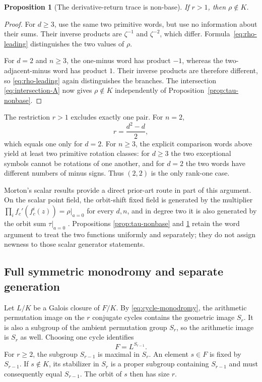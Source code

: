\documentclass[11pt]{article}
\newtheorem{proposition}[theorem]{Proposition}
\theoremstyle{definition}
\theoremstyle{remark}
\begin{document}
\begin{proposition}[The derivative-return trace is non-base]
\label{prop:rho-nonbase}
If $r>1$, then $\rho\notin K$.
\end{proposition}

\begin{proof}
For $d\geq3$, use the same two primitive words, but use no information about
their sums.  Their inverse products are $\zeta^{-1}$ and $\zeta^{-2}$,
which differ.  Formula~\eqref{eq:rho-leading} distinguishes the two values
of $\rho$.

For $d=2$ and $n\geq3$, the one-minus word has product $-1$, whereas the
two-adjacent-minus word has product $1$.  Their inverse products are
therefore different, so \eqref{eq:rho-leading} again distinguishes the
branches.  The intersection \eqref{eq:intersection-A} now gives
$\rho\notin K$ independently of Proposition~\ref{prop:tau-nonbase}.
\end{proof}

The restriction $r>1$ excludes exactly one pair.  For $n=2$,
\[
 r=\frac{d^2-d}{2},
\]
which equals one only for $d=2$.  For $n\geq3$, the explicit comparison
words above yield at least two primitive rotation classes: for $d\geq3$ the
two exceptional symbols cannot be rotations of one another, and for $d=2$
the two words have different numbers of minus signs.  Thus $(2,2)$ is the
only rank-one case.

Morton's scalar results provide a direct prior-art route in part of this
argument.  On the scalar point field, the orbit-shift fixed field is
generated by the multiplier
$\prod_i f_c'(f_c^i(z))=\rho|_{a=0}$ for every $d,n$, and in degree two it is
also generated by the orbit sum $\tau|_{a=0}$
\citep{morton-1996-algebraic-curves}.  Propositions
\ref{prop:tau-nonbase} and \ref{prop:rho-nonbase} retain the word argument to
treat the two functions uniformly and separately; they do not assign newness
to those scalar generator statements.

\subsection{Full symmetric monodromy and separate generation}

Let $L/K$ be a Galois closure of $F/K$.  By
\eqref{eq:cycle-monodromy}, the arithmetic permutation image on the $r$
conjugate cycles contains the geometric image $S_r$.  It is also a subgroup
of the ambient permutation group $S_r$, so the arithmetic image is $S_r$ as
well.  Choosing one cycle identifies
\[
 F=L^{S_{r-1}}.
\]
For $r\geq2$, the subgroup $S_{r-1}$ is maximal in $S_r$.  An element
$s\in F$ is fixed by $S_{r-1}$.  If $s\notin K$, its stabilizer in $S_r$ is
a proper subgroup containing $S_{r-1}$ and must consequently equal
$S_{r-1}$.  The orbit of $s$ then has size $r$.
\end{document}
